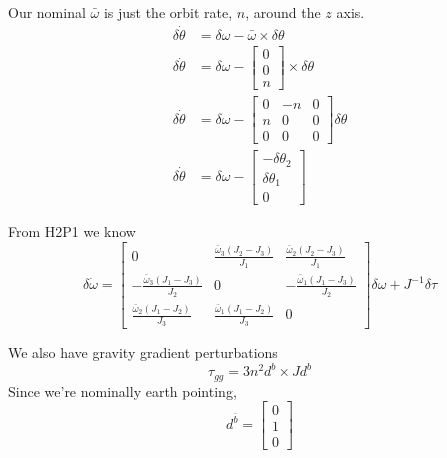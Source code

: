 \documentclass[]{article}
\begin{document}
Our nominal $\bar{\omega}$ is just the orbit rate, $n$, around the $z$ axis.
\begin{align}
	\delta \dot{\theta} & = \delta \omega - \bar{\omega} \times \delta \theta \\
	\delta \dot{\theta} & = \delta \omega - \begin{bmatrix} 0 \\ 0 \\ n	\end{bmatrix} \times \delta \theta \\
	\delta \dot{\theta} & = \delta \omega - \begin{bmatrix} 0 & -n & 0 \\ n & 0 & 0 \\ 0 & 0 & 0 \end{bmatrix} \delta \theta \\
	\delta \dot{\theta} & = \delta \omega - \begin{bmatrix}
		- \delta \theta_2 \\
		\delta \theta_1 \\
		0
	\end{bmatrix}
\end{align}

From H2P1 we know
\begin{equation}
	\label{eqn:linearized_omega}
	\delta \dot{\omega} = \begin{bmatrix}
		0 & \frac{\bar{\omega}_3(J_2 - J_3)}{J_1} & \frac{\bar{\omega}_2(J_2 - J_3)}{J_1} \\
		-\frac{\bar{\omega}_3(J_1 - J_3)}{J_2} & 0 & -\frac{\bar{\omega}_1(J_1 - J_3)}{J_2} \\
		\frac{\bar{\omega}_2(J_1 - J_2)}{J_3} & \frac{\bar{\omega}_1(J_1 - J_2)}{J_3} & 0
	\end{bmatrix} \delta \omega + J^{-1} \delta \tau
\end{equation}

We also have gravity gradient perturbations
\begin{equation}
	\tau_{gg} = 3 n^2 d^{b} \times J d^{b}
\end{equation}
Since we're nominally earth pointing,
\begin{equation}
	d^{\bar{b}} = \begin{bmatrix}
		0 \\
		1 \\
		0
	\end{bmatrix}
\end{equation}
\end{document}
